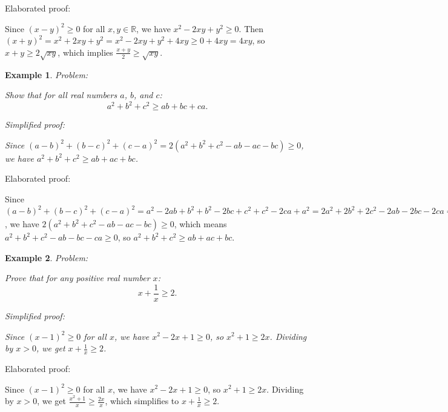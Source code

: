 \documentclass{article}
\newtheorem{example}{Example}
\begin{document}
Elaborated proof:
\begin{tcolorbox}[colback=green!10, width=\linewidth]
Since $(x-y)^2 \ge 0$ for all $x, y \in \mathbb{R}$, we have $x^2 - 2xy + y^2 \ge 0$. Then $(x+y)^2 = x^2 + 2xy + y^2 = x^2 - 2xy + y^2 + 4xy \ge 0 + 4xy = 4xy$, so $x+y \ge 2\sqrt{xy}$, which implies $\frac{x+y}{2} \ge \sqrt{xy}$.
\end{tcolorbox}



\begin{example}
Problem:
\begin{tcolorbox}[colback=yellow!10, width=\linewidth]
Show that for all real numbers $a$, $b$, and $c$:
    $$a^2 + b^2 + c^2 \geq ab + bc + ca.$$
\end{tcolorbox}

Simplified proof:
\begin{tcolorbox}[colback=blue!10, width=\linewidth]
Since $(a-b)^2 + (b-c)^2 + (c-a)^2 = 2(a^2 + b^2 + c^2 - ab - ac - bc) \ge 0$, we have $a^2 + b^2 + c^2 \ge ab + ac + bc$.
\end{tcolorbox}
\end{example}

Elaborated proof:
\begin{tcolorbox}[colback=green!10, width=\linewidth]
Since $(a-b)^2 + (b-c)^2 + (c-a)^2 = a^2 - 2ab + b^2 + b^2 - 2bc + c^2 + c^2 - 2ca + a^2 = 2a^2 + 2b^2 + 2c^2 - 2ab - 2bc - 2ca = 2(a^2 + b^2 + c^2 - ab - bc - ca) \ge 0$, we have $2(a^2 + b^2 + c^2 - ab - ac - bc) \ge 0$, which means $a^2 + b^2 + c^2 - ab - bc - ca \ge 0$, so $a^2 + b^2 + c^2 \ge ab + ac + bc$.
\end{tcolorbox}



\begin{example}
Problem:
\begin{tcolorbox}[colback=yellow!10, width=\linewidth]
Prove that for any positive real number $x$:
    $$x + \frac{1}{x} \geq 2.$$
\end{tcolorbox}

Simplified proof:
\begin{tcolorbox}[colback=blue!10, width=\linewidth]
Since $(x-1)^2 \ge 0$ for all $x$, we have $x^2 - 2x + 1 \ge 0$, so $x^2 + 1 \ge 2x$.  Dividing by $x > 0$, we get $x + \frac{1}{x} \ge 2$.
\end{tcolorbox}
\end{example}

Elaborated proof:
\begin{tcolorbox}[colback=green!10, width=\linewidth]
Since $(x-1)^2 \ge 0$ for all $x$, we have $x^2 - 2x + 1 \ge 0$, so $x^2 + 1 \ge 2x$.  Dividing by $x > 0$, we get $\frac{x^2 + 1}{x} \ge \frac{2x}{x}$, which simplifies to $x + \frac{1}{x} \ge 2$.
\end{tcolorbox}
\end{document}
